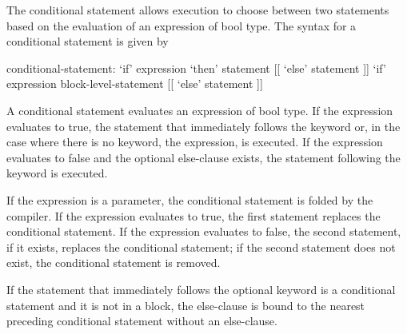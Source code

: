 The conditional statement allows execution to choose between two
statements based on the evaluation of an expression of bool type. The
syntax for a conditional statement is given by
\begin{syntax}
conditional-statement:
  `if' expression `then' statement [[ `else' statement ]]
  `if' expression block-level-statement [[ `else' statement ]]
\end{syntax}

A conditional statement evaluates an expression of bool type. If the
expression evaluates to true, the statement that immediately follows
the  keyword or, in the case where there is no 
keyword, the expression, is executed. If the expression evaluates to
false and the optional else-clause exists, the statement following the
 keyword is executed.

If the expression is a parameter, the conditional statement is folded
by the compiler. If the expression evaluates to true, the first
statement replaces the conditional statement. If the expression
evaluates to false, the second statement, if it exists, replaces the
conditional statement; if the second statement does not exist, the
conditional statement is removed.


If the statement that immediately follows the optional 
keyword is a conditional statement and it is not in a block, the
else-clause is bound to the nearest preceding conditional statement
without an else-clause.
